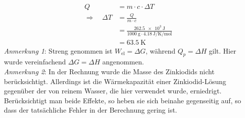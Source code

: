 \documentclass[ahaeffekt]{exercise}
\begin{document}
{\begin{alphlist}
       \begin{align*}
        Q &= m\cdot c \cdot \Delta T \\
        \Rightarrow\quad \Delta T &= \frac{Q}{m\cdot c} \\
         &= \frac{\SI{262.5e3}{\joule}}{\SI{1000}{\gram}\cdot\SI{4.18}{\joule\per\kelvin\per\mole}}\\
         &= \SI{63.5}{\kelvin}
       \end{align*}
       \emph{Anmerkung 1}: Streng genommen ist $W_\text{el}=\Delta G$, während $Q_p=\Delta H$ gilt. Hier wurde vereinfachend $\Delta G=\Delta H$ angenommen.\\
       \emph{Anmerkung 2}: In der Rechnung wurde die Masse des Zinkiodids nicht be\-rück\-sich\-tigt. Allerdings ist die Wärmekapazität einer Zinkiodid-Lösung gegenüber der von reinem Wasser, die hier verwendet wurde, erniedrigt. Berücksichtigt man beide Effekte, so heben sie sich beinahe gegenseitig auf, so dass der tatsächliche Fehler in der Berechnung gering ist.
\end{alphlist}
}
\end{document}
